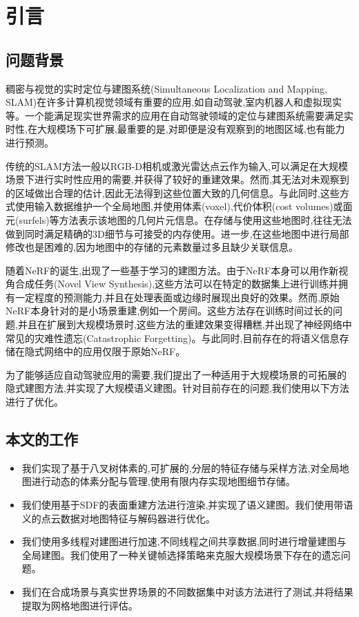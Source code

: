 \section{引言}\label{introduction}

\subsection{问题背景}

稠密与视觉的实时定位与建图系统(Simultaneous Localization and Mapping, SLAM)在许多计算机视觉领域有重要的应用,如自动驾驶,室内机器人和虚拟现实等。一个能满足现实世界需求的应用在自动驾驶领域的定位与建图系统需要满足实时性,在大规模场下可扩展,最重要的是,对即便是没有观察到的地图区域,也有能力进行预测。

传统的SLAM方法一般以RGB-D相机或激光雷达点云作为输入,可以满足在大规模场景下进行实时性应用的需要,并获得了较好的重建效果。然而,其无法对未观察到的区域做出合理的估计,因此无法得到这些位置大致的几何信息。与此同时,这些方式使用输入数据维护一个全局地图,并使用体素(voxel),代价体积(cost volumes)或面元(surfels)等方法表示该地图的几何片元信息。在存储与使用这些地图时,往往无法做到同时满足精确的3D细节与可接受的内存使用。进一步,在这些地图中进行局部修改也是困难的,因为地图中的存储的元素数量过多且缺少关联信息。

随着NeRF\cite{nerf}的诞生,出现了一些基于学习的建图方法。由于NeRF本身可以用作新视角合成任务(Novel View Synthesis),这些方法可以在特定的数据集上进行训练并拥有一定程度的预测能力,并且在处理表面或边缘时展现出良好的效果。然而,原始NeRF本身针对的是小场景重建,例如一个房间。这些方法存在训练时间过长的问题,并且在扩展到大规模场景时,这些方法的重建效果变得糟糕,并出现了神经网络中常见的灾难性遗忘(Catastrophic Forgetting)。与此同时,目前存在的将语义信息存储在隐式网络中的应用仅限于原始NeRF。

为了能够适应自动驾驶应用的需要,我们提出了一种适用于大规模场景的可拓展的隐式建图方法,并实现了大规模语义建图。针对目前存在的问题,我们使用以下方法进行了优化。
\subsection{本文的工作}
\begin{itemize}
	\item 我们实现了基于八叉树体素的,可扩展的,分层的特征存储与采样方法,对全局地图进行动态的体素分配与管理,使用有限内存实现地图细节存储。
	\item 我们使用基于SDF的表面重建方法进行渲染,并实现了语义建图。我们使用带语义的点云数据对地图特征与解码器进行优化。
	\item 我们使用多线程对建图进行加速,不同线程之间共享数据,同时进行增量建图与全局建图。我们使用了一种关键帧选择策略来克服大规模场景下存在的遗忘问题。
	\item 我们在合成场景与真实世界场景的不同数据集中对该方法进行了测试,并将结果提取为网格地图进行评估。
\end{itemize}


